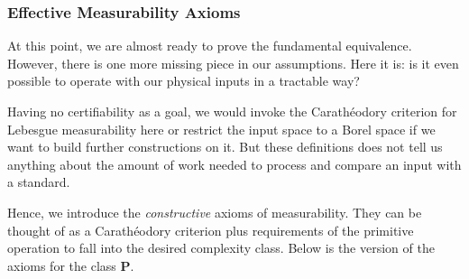 \documentclass{article}
\theoremstyle{definition}
\theoremstyle{plain}
\begin{document}
\subsubsection{Effective Measurability Axioms}
At this point, we are almost ready to prove the fundamental equivalence. However, there is one more missing piece in our assumptions. Here it is: is it even possible to operate with our physical inputs in a tractable way? 

Having no certifiability as a goal, we would invoke the Carathéodory criterion for Lebesgue measurability here or restrict the input space to a Borel space if we want to build further constructions on it. But these definitions does not tell us anything about the amount of work needed to process and compare an input with a standard.

Hence, we introduce the \emph{constructive} axioms of measurability. They can be thought of as a Carathéodory criterion plus requirements of the primitive operation to fall into the desired complexity class. Below is the version of the axioms for the class $\mathbf{P}$.
\end{document}
